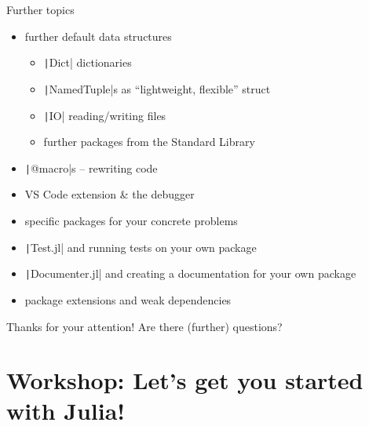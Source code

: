 \documentclass[aspectratio=169, 11pt, handout]{beamer}
\begin{document}
    \begin{frame}{Further topics}
        \begin{itemize}
            \item further default data structures
            \begin{itemize}
                \item \texttt|Dict| dictionaries
                \item \texttt|NamedTuple|s as “lightweight, flexible” struct
                \item \texttt|IO| reading/writing files
                \item further packages from the Standard Library
            \end{itemize}
            \item \texttt|@macro|s – rewriting code
            \item VS Code extension \& the debugger
            \item specific packages for your concrete problems
            \item \texttt|Test.jl| and running tests on your own package
            \item \texttt|Documenter.jl| and creating a documentation for your own package
            \item \alert{package extensions} and weak dependencies
        \end{itemize}
    \end{frame}
    \begin{frame}{Thanks for your attention!}
        Are there (further) questions?
    \end{frame}
    \section{Workshop: Let's get you started with Julia!}
\end{document}
